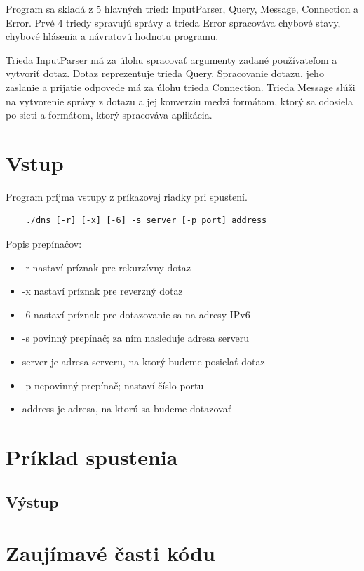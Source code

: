 Program sa skladá z 5 hlavných tried: InputParser, Query, Message, Connection a Error. Prvé 4 triedy spravujú správy a trieda Error spracováva chybové stavy, chybové hlásenia a návratovú hodnotu programu.

Trieda InputParser má za úlohu spracovať argumenty zadané používateľom a vytvoriť dotaz. Dotaz reprezentuje trieda Query.
Spracovanie dotazu, jeho zaslanie a prijatie odpovede má za úlohu trieda Connection. Trieda Message slúži na vytvorenie správy z dotazu a jej konverziu medzi 
formátom, ktorý sa odosiela po sieti a formátom, ktorý spracováva aplikácia.



\section{Vstup}
\label{Vstup}

Program príjma vstupy z príkazovej riadky pri spustení. 
\begin{verbatim}
    ./dns [-r] [-x] [-6] -s server [-p port] address
\end{verbatim}
    
Popis prepínačov:
\begin{itemize}
    \item -r nastaví príznak pre rekurzívny dotaz
    \item -x nastaví príznak pre reverzný dotaz 
    \item -6 nastaví príznak pre dotazovanie sa na adresy IPv6 
    \item -s povinný prepínač; za ním nasleduje adresa serveru
    \item server je adresa serveru, na ktorý budeme posielať dotaz
    \item -p nepovinný prepínač; nastaví číslo portu
    \item address je adresa, na ktorú sa budeme dotazovať
\end{itemize} 

\section{Príklad spustenia}
\label{Príklad spustenia}

\subsection{Výstup}
\label{Výstup}

\section{Zaujímavé časti kódu}
\label{Zaujímavé časti kódu}

